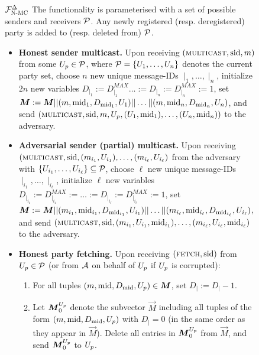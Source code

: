 \begin{figure}
\begin{systembox}{$\mathcal{F}_{\textsc{N-MC}}^{\Delta}$}
	The functionality is parameterised with a set of possible senders and receivers $\mathcal{P}$. Any newly registered (resp. deregistered) party is added to  (resp. deleted from) $\mathcal{P}$.
	
	{\small
		\begin{itemize}
			\item \textbf{Honest sender multicast.} Upon receiving $(\textsc{multicast},\text{sid},m)$ from some ${U_p}\in\mathcal{P}$, where $\mathcal{P}=\{U_1,\ldots,U_n\}$ denotes the current party set, choose $n$ new unique message-IDs $\mid_1,\ldots,\mid_{n}$, initialize $2n$ new variables $D_{\mid_1}:=D_{\mid_1}^{MAX}\ldots:=D_{\mid_n}:=D_{\mid_n}^{MAX}:=1$, set $\vec{M}:=\vec{M}||(m,\mid_1,D_{\mid_1},\stkh_1)||\ldots||(m,\mid_n,D_{\mid_n},\stkh_n)$, and send $(\textsc{multicast},\text{sid},m,{U_p},(U_1,\text{mid}_1),\ldots,(U_n,\text{mid}_n))$ to the adversary.
			\smallskip
			\item \textbf{Adversarial sender (partial) multicast.}
			Upon receiving $(\textsc{multicast},\text{sid},(m_{i_1},U_{i_1}),\ldots,(m_{i_\ell},U_{i_\ell})$ from the adversary with $\{U_{i_1},\ldots,U_{i_\ell}\}\subseteq\mathcal{P}$, choose $\ell$ new unique message-IDs $\mid_{i_1},\ldots,\mid_{i_\ell}$, initialize $\ell$ new variables $D_{\mid_{i_1}}:=D_{\mid_{i_1}}^{MAX}:=\ldots:=D_{\mid_{i_\ell}}:=D_{\mid_{i_\ell}}^{MAX}:=1$, set $\vec{M}:=\vec{M}||(m_{i_1},\mid_{i_1},D_{\mid_{i_1}},\stkh_{i_1})||\ldots||(m_{i_\ell},\mid_{i_\ell},D_{\mid_{i_\ell}},\stkh_{i_\ell})$, and send $(\textsc{multicast},\text{sid},(m_{i_1},U_{i_1},\text{mid}_{i_1}),\ldots, (m_{i_\ell},U_{i_\ell},\text{mid}_{i_\ell})$ to the adversary.   
			
			\smallskip
			\item \textbf{Honest party fetching.}
			Upon receiving $(\textsc{fetch},\text{sid})$ from ${U_p} \in\mathcal{P}$ (or from $\mathcal{A}_{\relax}$ on behalf of ${U_p}$ if ${U_p}$ is corrupted):
			\begin{enumerate}
				\item For all tuples  $(m,\mid,D_\mid,\party)\in\vec{M}$, set $D_\mid:=D_\mid-1$.
				\item Let $\vec{M}_0^{\party}$ denote the subvector $\vec{M}$ including all tuples of the form $(m,\text{mid},D_{\text{mid}},{U_p})$ with $D_\mid=0$ (in the same order as they appear in $\vec{M}$).  
				Delete all entries in $\vec{M}^{\party}_0$ from $\vec{M}$,  and send $\vec{M}^{\party}_0$ to ${U_p}$.
				

\end{enumerate}
\end{itemize}}
\end{systembox}
\end{figure}
